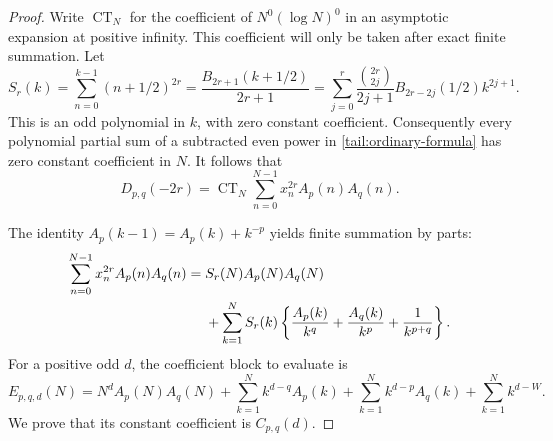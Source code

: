 \begin{proof}
Write \(\operatorname{CT}_N\) for the coefficient of
\(N^0(\log N)^0\) in an asymptotic expansion at positive infinity.
This coefficient will only be taken after exact finite summation.
Let
\begin{equation}\label{tail:S}
 S_r(k)=\sum_{n=0}^{k-1}(n+1/2)^{2r}
       =\frac{B_{2r+1}(k+1/2)}{2r+1}
       =\sum_{j=0}^{r}
         \frac{\binom{2r}{2j}}{2j+1}
         B_{2r-2j}(1/2)k^{2j+1}.
\end{equation}
This is an odd polynomial in \(k\), with zero constant coefficient.
Consequently every polynomial partial sum of a subtracted even power
in \eqref{tail:ordinary-formula} has zero constant coefficient in
\(N\). It follows that
\begin{equation}\label{tail:CT-moment}
 D_{p,q}(-2r)=\operatorname{CT}_N
              \sum_{n=0}^{N-1}x_n^{2r}A_p(n)A_q(n).
\end{equation}

The identity \(A_p(k-1)=A_p(k)+k^{-p}\) yields finite summation by
parts:
\begin{align}\label{tail:finite-summation}
 \sum_{n=0}^{N-1}x_n^{2r}A_p(n)A_q(n)
 ={}&S_r(N)A_p(N)A_q(N)\notag\\
 &+\sum_{k=1}^{N}S_r(k)
  \left\{\frac{A_p(k)}{k^q}+\frac{A_q(k)}{k^p}
                     +\frac1{k^{p+q}}\right\}.
\end{align}
For a positive odd \(d\), the coefficient block to evaluate is
\begin{equation}\label{tail:E}
 E_{p,q,d}(N)=N^dA_p(N)A_q(N)
 +\sum_{k=1}^{N}k^{d-q}A_p(k)
 +\sum_{k=1}^{N}k^{d-p}A_q(k)
 +\sum_{k=1}^{N}k^{d-W}.
\end{equation}
We prove that its constant coefficient is \(C_{p,q}(d)\).


\end{proof}
